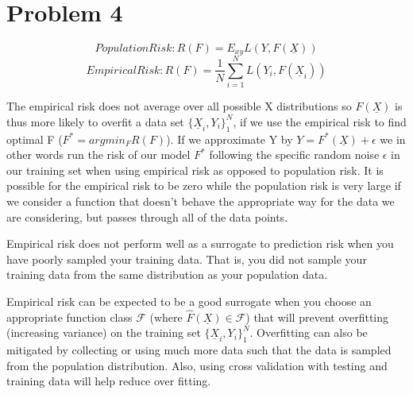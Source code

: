 \documentclass[11pt]{article}
\begin{document}
\begin{center}

\ \\
\end{center}

\section*{Problem 4}

$$Population Risk: R(F) = E_{xy}L(Y,F(\underline{X}))$$
$$ Empirical Risk: R(F) = \frac{1}{N}\sum_{i=1}^NL(Y_i, F(\underline{X}_i))$$ 

\vspace{5 mm}
\noindent
The empirical risk does not average over all possible X distributions so 
$F(\underline{X})$ is thus more likely to overfit a data set 
$\{\underline{X}_i, Y_i\}_1^N$, if we use the empirical risk to find optimal F 
($F^* = argmin_FR(F)$). If we approximate Y by 
$Y=F^*(\underline{X}) + \epsilon$ we in other words run the risk of our model 
$F^*$ following the specific random noise $\epsilon$ in our training set when 
using empirical risk as opposed to population risk. It is possible for the 
empirical risk to be zero while the population risk is very large if we 
consider a function that doesn't behave the appropriate way for the data we are 
considering, but passes through all of the  data points. 

\vspace{5 mm}
\noindent
Empirical risk does not perform well as a surrogate to prediction risk when 
you have poorly sampled your training data. That is, you did not sample your 
training data from the same distribution as your population data.

\vspace{5 mm}
\noindent
Empirical risk can be expected to be a good surrogate when you choose an 
appropriate function class $\mathscr{F}$ (where 
$\hat{F}(\underline{X}) \in \mathscr{F}$) that will prevent overfitting 
(increasing variance) on the training set $\{\underline{X}_i, Y_i\}_1^N$. 
Overfitting can also be mitigated by collecting or using much more data such 
that the data is sampled from the population distribution. Also, using cross 
validation with testing and training data will help reduce over fitting.
\end{document}

